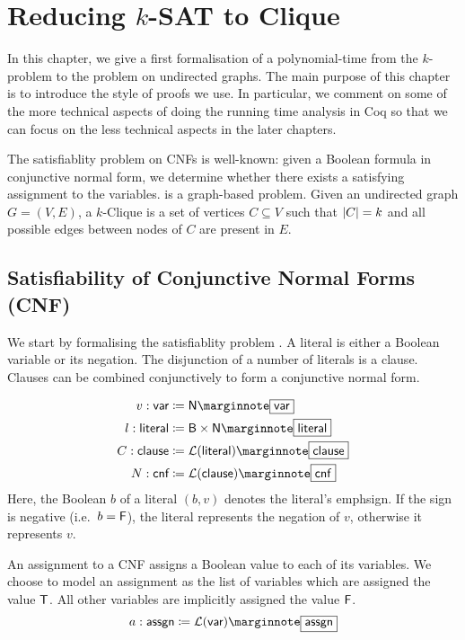 
\chapter{Reducing $k$-SAT to Clique}\label{chap:ksat_clique}
In this chapter, we give a first formalisation of a polynomial-time from the $k$-\SAT{} problem to the \Clique{} problem on undirected graphs. The main purpose of this chapter is to introduce the style of proofs we use. In particular, we comment on some of the more technical aspects of doing the running time analysis in Coq so that we can focus on the less technical aspects in the later chapters.

The satisfiablity problem on CNFs is well-known: given a Boolean formula in conjunctive normal form, we determine whether there exists a satisfying assignment to the variables. 
\Clique{} is a graph-based problem. Given an undirected graph $G = (V, E)$, a $k$-Clique is a set of vertices $C \subseteq V$ such that $|C| = k$ and all possible edges between nodes of $C$ are present in $E$. 

\section{Satisfiability of Conjunctive Normal Forms (CNF)}\label{sec:sat}
We start by formalising the satisfiablity problem \SAT{}.
A literal is either a Boolean variable or its negation. The disjunction of a number of literals is a clause. Clauses can be combined conjunctively to form a conjunctive normal form. 

\newcommand*{\bvar}{\textsf{var}}
\newcommand*{\literal}{\textsf{literal}}
\newcommand*{\clause}{\textsf{clause}}
\newcommand*{\cnf}{\textsf{cnf}}
\newcommand*{\assgn}{\textsf{assgn}}
\newcommand*{\eval}{\mathcal{E}}
\newcommand*{\evalA}[2]{\eval~#1~#2}
\begin{align*}
  v : \bvar &\defeq \nat \mnote{\bvar}\\
  l : \literal &\defeq \bool \times \nat \mnote{\literal}\\
  C : \clause &\defeq \listsof{\literal} \mnote{\clause}\\
  N : \cnf &\defeq \listsof{\clause} \mnote{\cnf}
\end{align*}
Here, the Boolean $b$ of a literal $(b, v)$ denotes the literal's emph{sign}. If the sign is negative (i.e.\ $b = \mathsf{F}$), the literal represents the negation of $v$, otherwise it represents $v$.

An assignment to a CNF assigns a Boolean value to each of its variables. We choose to model an assignment as the list of variables which are assigned the value $\mathsf{T}$. All other variables are implicitly assigned the value $\mathsf{F}$.
\[a : \assgn \defeq \listsof{\bvar}\mnote{\assgn} \]


